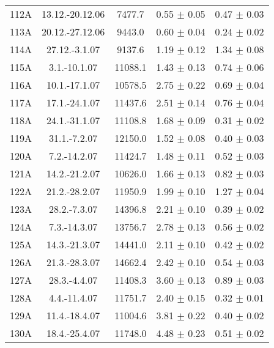\documentclass[a4paper,12pt]{article}
\begin{document}
\begin{center}
\begin{longtable}{|c|c|c|c|c|}
    112A &      13.12.-20.12.06 &       7477.7  &       0.55 $\pm$ 0.05 &       0.47 $\pm$ 0.03 \\
    113A &      20.12.-27.12.06 &       9443.0  &       0.60 $\pm$ 0.04 &       0.24 $\pm$ 0.02 \\
    114A &      27.12.-3.1.07   &       9137.6  &       1.19 $\pm$ 0.12 &       1.34 $\pm$ 0.08 \\
    115A &      3.1.-10.1.07    &       11088.1 &       1.43 $\pm$ 0.13 &       0.74 $\pm$ 0.06 \\
    116A &      10.1.-17.1.07   &       10578.5 &       2.75 $\pm$ 0.22 &       0.69 $\pm$ 0.04 \\
    117A &      17.1.-24.1.07   &       11437.6 &       2.51 $\pm$ 0.14 &       0.76 $\pm$ 0.04 \\
    118A &      24.1.-31.1.07   &       11108.8 &       1.68 $\pm$ 0.09 &       0.31 $\pm$ 0.02 \\
    119A &      31.1.-7.2.07    &       12150.0 &       1.52 $\pm$ 0.08 &       0.40 $\pm$ 0.03 \\
    120A &      7.2.-14.2.07    &       11424.7 &       1.48 $\pm$ 0.11 &       0.52 $\pm$ 0.03 \\
    121A &      14.2.-21.2.07   &       10626.0 &       1.66 $\pm$ 0.13 &       0.82 $\pm$ 0.03 \\
    122A &      21.2.-28.2.07   &       11950.9 &       1.99 $\pm$ 0.10 &       1.27 $\pm$ 0.04 \\
    123A &      28.2.-7.3.07    &       14396.8 &       2.21 $\pm$ 0.10 &       0.39 $\pm$ 0.02 \\
    124A &      7.3.-14.3.07    &       13756.7 &       2.78 $\pm$ 0.13 &       0.56 $\pm$ 0.02 \\
    125A &      14.3.-21.3.07   &       14441.0 &       2.11 $\pm$ 0.10 &       0.42 $\pm$ 0.02 \\
    126A &      21.3.-28.3.07   &       14662.4 &       2.42 $\pm$ 0.10 &       0.54 $\pm$ 0.03 \\
    127A &      28.3.-4.4.07    &       11408.3 &       3.60 $\pm$ 0.13 &       0.89 $\pm$ 0.03 \\
    128A &      4.4.-11.4.07    &       11751.7 &       2.40 $\pm$ 0.15 &       0.32 $\pm$ 0.01 \\
    129A &      11.4.-18.4.07   &       11004.6 &       3.81 $\pm$ 0.22 &       0.40 $\pm$ 0.02 \\
    130A &      18.4.-25.4.07   &       11748.0 &       4.48 $\pm$ 0.23 &       0.51 $\pm$ 0.02 \\

\end{longtable}
\end{center}
\end{document}
